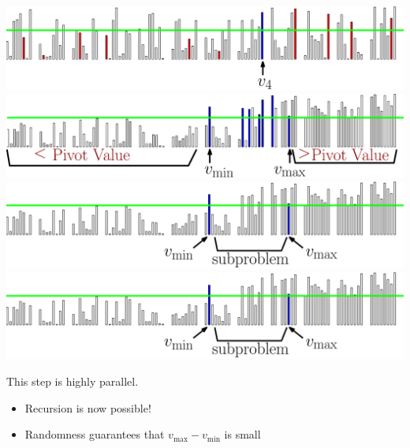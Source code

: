 \documentclass[xcolor=x11names, svgnames, rgb]{beamer}
\begin{document}
\begin{frame}[t]{}
\begin{overprint}
	\includegraphics[width=\linewidth]{imgs/smoothedAlgSim/smoothedAlgSim_35.eps}
	\onslide<5>\includegraphics[width=\linewidth]{imgs/smoothedAlgSim/smoothedAlgSim_4.eps}
	\onslide<6>\includegraphics[width=\linewidth]{imgs/smoothedAlgSim/smoothedAlgSim_45.eps}
	\onslide<7>\includegraphics[width=\linewidth]{imgs/smoothedAlgSim/smoothedAlgSim_45.eps}
	\end{overprint}
	\vspace{0.25cm}
	\begin{overprint}
	This step is highly parallel.
 \begin{itemize} \item Recursion is now possible! \item Randomness guarantees that $v_{\max} - v_{\min}$ is small \end{itemize} 
	\end{overprint}
\end{frame}
\end{document}
